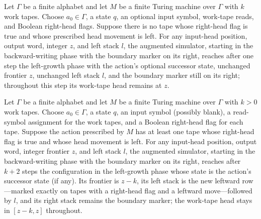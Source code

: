 \begin{lemma}
\label{Turing.FinTM.dg_end_without_growth}
\leanok
{}
Let $\Gamma$ be a finite alphabet and let $M$ be a finite Turing machine over $\Gamma$
with $k$ work tapes. Choose $a_0\in\Gamma$, a state $q$, an optional input symbol,
work-tape reads, and Boolean right-head flags. Suppose there is no tape whose right-head
flag is true and whose prescribed head movement is left. For any input-head position,
output word, integer $z$, and left stack $l$, the augmented simulator, starting in the
backward-writing phase with the boundary marker on its right, reaches after one step the
left-growth phase with the action's optional successor state, unchanged frontier $z$,
unchanged left stack $l$, and the boundary marker still on its right; throughout this
step its work-tape head remains at $z$.
\end{lemma}

\begin{lemma}
\label{Turing.FinTM.dg_end_with_growth}
\leanok
{}
Let $\Gamma$ be a finite alphabet and let $M$ be a finite Turing machine over $\Gamma$
with $k>0$ work tapes. Choose $a_0\in\Gamma$, a state $q$, an input symbol (possibly
blank), a read-symbol assignment for the work tapes, and a Boolean right-head flag for
each tape. Suppose the action prescribed by $M$ has at least one tape whose right-head
flag is true and whose head movement is left. For any input-head position, output word,
integer frontier $z$, and left stack $l$, the augmented simulator, starting in the
backward-writing phase with the boundary marker on its right, reaches after $k+2$ steps
the configuration in the left-growth phase whose state is the action's successor state
(if any). Its frontier is $z-k$, its left stack is the new leftward row—marked exactly
on tapes with a right-head flag and a leftward move—followed by $l$, and its right stack
remains the boundary marker; the work-tape head stays in $[z-k,z]$ throughout.
\end{lemma}

